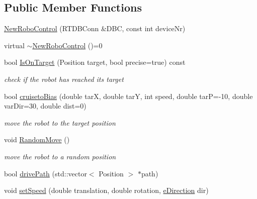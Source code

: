 \subsection*{Public Member Functions}
\begin{DoxyCompactItemize}
\item 
\hyperlink{classNewRoboControl_a81f7ad52f88ea8fb90eeff5650efa1c5}{NewRoboControl} (RTDBConn \&DBC, const int deviceNr)
\item 
virtual \hyperlink{classNewRoboControl_ae63cbd6c60d37882d176e9e7d60b11ba}{$\sim$NewRoboControl} ()=0
\item 
bool \hyperlink{classNewRoboControl_a77b0e86bef15f3b1fb6cf98d91c6a9b4}{IsOnTarget} (Position target, bool precise=true) const 
\begin{DoxyCompactList}\small\item\em check if the robot has reached its target \item\end{DoxyCompactList}\item 
bool \hyperlink{classNewRoboControl_a30944b8982d85ab2ee83fd248b731bc0}{cruisetoBias} (double tarX, double tarY, int speed, double tarP=-\/10, double varDir=30, double dist=0)
\begin{DoxyCompactList}\small\item\em move the robot to the target position \item\end{DoxyCompactList}\item 
void \hyperlink{classNewRoboControl_ab3231acd7efd60677b4f48b094cb6dd3}{RandomMove} ()
\begin{DoxyCompactList}\small\item\em move the robot to a random position \item\end{DoxyCompactList}\item 
bool \hyperlink{classNewRoboControl_a9816eae1b7c90dbb74a7e0365e2b57e9}{drivePath} (std::vector$<$ Position $>$ $\ast$path)
\item 
void \hyperlink{classNewRoboControl_ad2ddddb5f0272a733021524ebaaaeffd}{setSpeed} (double translation, double rotation, \hyperlink{classNewRoboControl_a077fa253b827c190e82c1ce1e4c8d18f}{eDirection} dir)
\end{DoxyCompactItemize}
